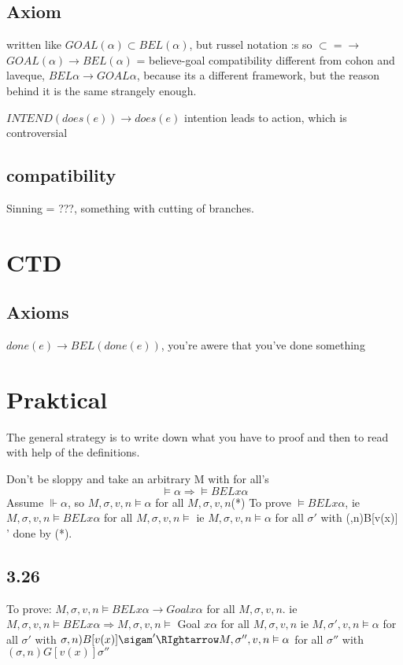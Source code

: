 \documentclass{article}
\begin{document}
\subsection{Axiom}
written like $GOAL(\alpha) \subset BEL(\alpha)$, but russel notation :s so
$\subset = \to$
$GOAL(\alpha) \to BEL(\alpha)$ = believe-goal compatibility
different from cohon and laveque, $BEL \alpha \to GOAL \alpha$, because
its a different framework, but the reason behind it is the same strangely
enough.

$INTEND(does(e))\to does(e)$ intention leads to action, which is controversial

\subsection{compatibility}
Sinning = ???, something with cutting of branches.

\section{CTD}
\subsection{Axioms}
$done(e) \to BEL(done(e))$,  you're awere that you've done something


\section{Praktical}
The general strategy is to write down what you have to proof and then to
read with help of the definitions.

Don't be sloppy and take an arbitrary M with for all's
\[\vDash \alpha \Rightarrow \vDash BEL x \alpha\]
Assume $\Vdash \alpha$, so $M,\sigma,v,n\vDash \alpha$ for all $M,\sigma,v,n$(*)
To prove $\vDash BEL x \alpha$, 
	ie $M,\sigma,v,n\vDash BEL x \alpha$ for all $M,\sigma,v,n\vDash$
	ie $M,\sigma,v,n\vDash\alpha$ for all $\sigma'$ with (\sigma,n)B[v(x)]
	\sigma' done by (*).

\subsection{3.26}
	To prove: $M,\sigma,v,n\vDash BEL x \alpha \to Goal x \alpha$ for all 
	$M,\sigma,v,n$.
	ie $M,\sigma,v,n\vDash BEL x \alpha \Rightarrow M,\sigma,v,n\vDash$ Goal
		$x \alpha$ for all $M,\sigma,v,n$
		ie $M,\sigma',v,n\vDash \alpha$ for all $\sigma'$ with $\sigma,n)
		B[v(x)]\sigam'\RIghtarrow M,\sigma'',v,n\vDash \alpha$ for all
		$\sigma''$ with $(\sigma,n)G[v(x)]\sigma''$
\end{document}
